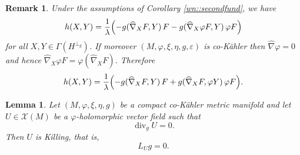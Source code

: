 \documentclass[12pt,a4paper,final]{amsart}
\numberwithin{equation}{section}
\newtheorem{lm}[tw]{Lemma}
\newtheorem{uw}[tw]{Remark}
\theoremstyle{df}
\newcommand{\X}{\mathcal{X}}
\newcommand{\XM}{\X(M)}
\newcommand{\eps}{\varepsilon}
\begin{document}
\begin{uw}\label{uw::secondfund}
Under the assumptions of Corollary \ref{wn::secondfund}, we have
$$
h(X,Y)=\frac{1}{\lambda}\Bigl(-g(\widehat{\nabla}_XF,Y)\,F-g(\widehat{\nabla}_X\varphi F,Y)\,\varphi F\Bigr)
$$
for all $X,Y\in\Gamma(H^{\perp_g})$.
If moreover $(M,\varphi,\xi,\eta,g,\eps)$ is co-K\"ahler then $\widehat{\nabla}\varphi=0$ and hence $\widehat{\nabla}_X\varphi F=\varphi(\widehat{\nabla}_XF)$.
Therefore
$$
h(X,Y)=\frac{1}{\lambda}\Bigl(-g(\widehat{\nabla}_XF,Y)\,F+g(\widehat{\nabla}_XF,\varphi Y)\,\varphi F\Bigr).
$$
\end{uw}

\begin{lm}\label{lm::cok::killing}
Let $(M,\varphi,\xi,\eta,g)$ be a compact co-K\"ahler metric manifold and let
$U\in\XM$ be a $\varphi$-holomorphic vector field such that
$$
\operatorname{div}_gU=0.
$$
Then $U$ is Killing, that is,
$$
L_Ug=0.
$$
\end{lm}
\end{document}
